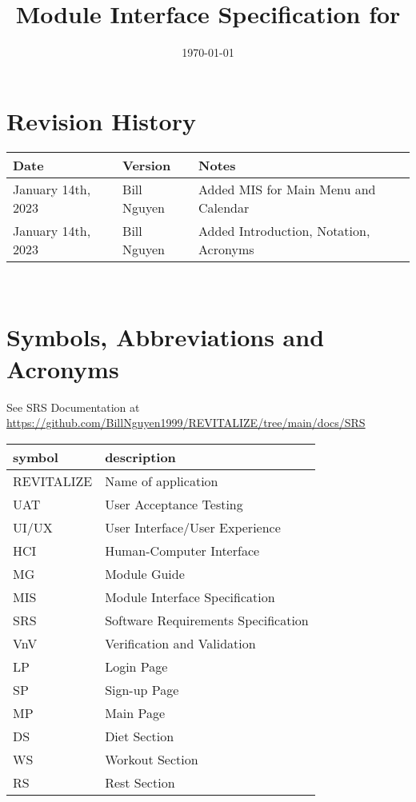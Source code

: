 \documentclass[12pt, titlepage]{article}
\begin{document}
\title{Module Interface Specification for \progname{}}

\author{\authname}

\date{\today}

\maketitle


\section{Revision History}

\begin{tabularx}{\textwidth}{p{3cm}p{2cm}X}
	\toprule {\bf Date} & {\bf Version} & {\bf Notes}\\
	\midrule
	January 14th, 2023 & Bill Nguyen  & Added MIS for Main Menu and Calendar\\
	January 14th, 2023 & Bill Nguyen  & Added Introduction, Notation, Acronyms\\
	\bottomrule
\end{tabularx}

~\newpage

\section{Symbols, Abbreviations and Acronyms}

See SRS Documentation at \url{https://github.com/BillNguyen1999/REVITALIZE/tree/main/docs/SRS}

\renewcommand{\arraystretch}{1.2}
\begin{tabular}{l l} 
	\toprule		
	\textbf{symbol} & \textbf{description}\\
	\midrule 
	REVITALIZE & Name of application\\
	UAT & User Acceptance Testing\\
	UI/UX & User Interface/User Experience\\
	HCI & Human-Computer Interface\\
	MG & Module Guide\\
	MIS & Module Interface Specification\\
	SRS & Software Requirements Specification\\
	VnV & Verification and Validation\\
	LP & Login Page\\
	SP & Sign-up Page\\
	MP & Main Page\\
	DS & Diet Section\\
	WS & Workout Section\\
	RS & Rest Section\\
	\bottomrule
\end{tabular}\\
\end{document}
